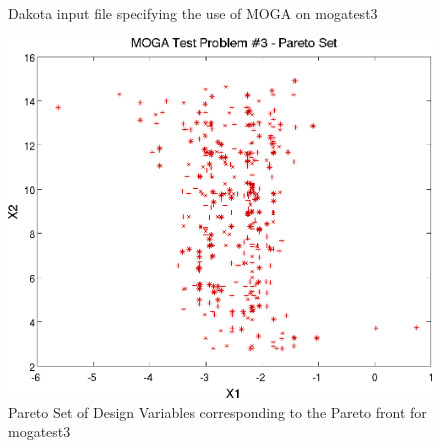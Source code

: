 \begin{figure}
  \centering
  \begin{bigbox}
    \begin{small}
    \end{small}
  \end{bigbox}
  \caption{Dakota input file specifying the use of MOGA on mogatest3}
  \label{additional:moga3inp}
\end{figure}

\begin{figure}
  \centering
  \includegraphics[scale=0.75]{images/dakota_mogatest3_pareto_set}
  \caption{Pareto Set of Design Variables corresponding to the Pareto
    front for mogatest3}
  \label{additional:moga3set}
\end{figure}

